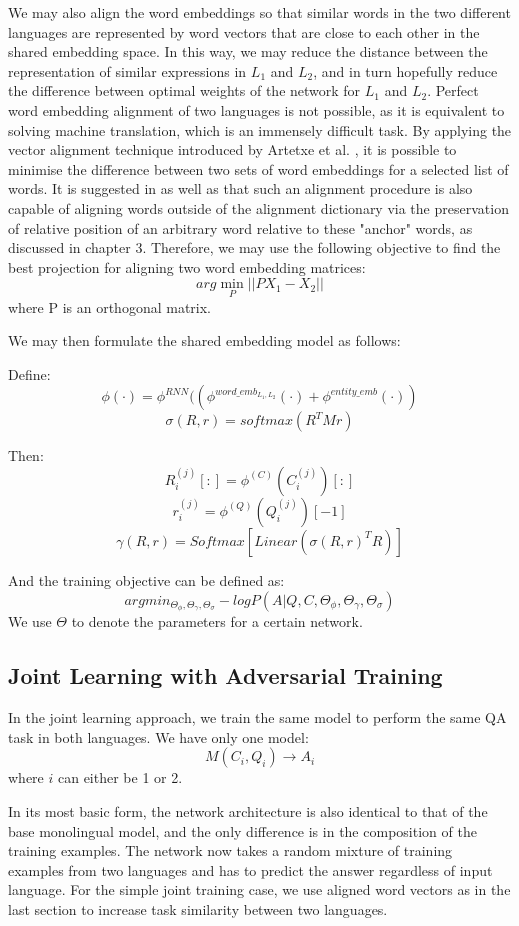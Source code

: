 \documentclass[]{article}
\begin{document}
We may also align the word embeddings so that similar words in the two different languages are represented by word vectors that are close to each other in the shared embedding space. In this way, we may reduce the distance between the representation of similar expressions in $L_1$ and $L_2$, and in turn hopefully reduce the difference between optimal weights of the network for $L_1$ and $L_2$. Perfect word embedding alignment of two languages is not possible, as it is equivalent to solving machine translation, which is an immensely difficult task. By applying the vector alignment technique introduced by Artetxe et al. \cite{artetxe2016learning}, it is possible to minimise the difference between two sets of word embeddings for a selected list of words. It is suggested in \cite{artetxe2016learning} as well as \cite{duong2017multilingual} that such an alignment procedure is also capable of aligning words outside of the alignment dictionary via the preservation of relative position of an arbitrary word relative to these "anchor" words, as discussed in chapter 3. Therefore, we may use the following objective to find the best projection for aligning two word embedding matrices:
\[ arg\min_P ||PX_1 - X_2|| \]
where P is an orthogonal matrix.

We may then formulate the shared embedding model as follows:

Define:
\[ \phi(\cdot)=\phi^{RNN}((\phi^{word\_emb_{L_1, L_2}}(\cdot) + \phi^{entity\_emb}(\cdot)) \]
\[ \sigma(R, r)=softmax(R^T M r) \]

Then:
\[ R_i^{(j)}[:]=\phi^{(C)}(C_i^{(j)})[:] \]
\[ r_i^{(j)}=\phi^{(Q)}(Q_i^{(j)})[-1] \]
\[ \gamma(R, r) = Softmax[Linear(\sigma(R, r)^T R)] \]

And the training objective can be defined as:
\[ argmin_{\Theta_\phi, \Theta_\gamma, \Theta_\sigma} -logP(A|Q, C, \Theta_\phi, \Theta_\gamma, \Theta_\sigma) \]
We use $\Theta$ to denote the parameters for a certain network.

\subsection{Joint Learning with Adversarial Training}

In the joint learning approach, we train the same model to perform the same QA task in both languages. We have only one model:
\[ M(C_i, Q_i) \to A_i \]
where $i$ can either be 1 or 2. 

In its most basic form, the network architecture is also identical to that of the base monolingual model, and the only difference is in the composition of the training examples. The network now takes a random mixture of training examples from two languages and has to predict the answer regardless of input language. For the simple joint training case, we use aligned word vectors as in the last section to increase task similarity between two languages.
\end{document}
